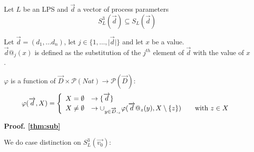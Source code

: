 \index{}\documentclass[a4paper,10pt]{article}
\theoremstyle{plain}
\theoremstyle{definition}
\newcommand{\ovr}{\overrightarrow}
\newcommand{\pps}{process parameters}
\newcommand{\tb}{\textbf}
\begin{document}
\begin{thm} Let $L$ be an LPS and $\ovr{d}$ a vector of \pps \label{thm:sub}
$$S_L^3(\ovr{d}) \subseteq S_L(\ovr{d}) $$
\end{thm}
\begin{flushleft}

\begin{defn}[$@$] Let $\ovr{d} = (d_1, \dots d_n)$, let $j \in \lbrace 1, \ldots , \vert \ovr{d} \vert \rbrace$ and let $x$ be a value.\\
$\ovr{d}@_j(x)$ is defined as the substitution of the $j^{th}$ element of $\ovr{d}$ with the value of $x$.
\end{defn}


\begin{defn}[$\varphi(\ovr{d},X)$]
$\varphi$ is a function of $\ovr{D} \times \mathcal{P}(Nat) \rightarrow \mathcal{P}(\ovr{D})$:
\begin{displaymath}
    \varphi(\ovr{d},X) = \left \{
        \begin{array}{l l}
            X = \emptyset                       & \rightarrow \lbrace \ovr{d} \rbrace \\
            X \neq \emptyset                    & \rightarrow \cup_{y \in \ovr{D}._z} \varphi(\ovr{d}@_z(y), X \setminus \lbrace z \rbrace ) \hspace{20pt} \text{with } z \in X \\
        \end{array} \right.
\end{displaymath}

\end{defn}

\tb{Proof. \ref{thm:sub}}
\end{flushleft}
We do case distinction on $S_L^3(\ovr{v_0})$:\\
\end{document}
